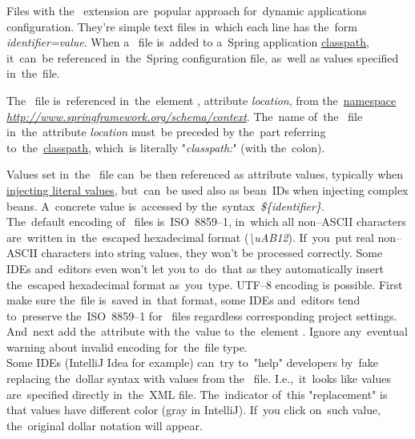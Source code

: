Files with the~ extension are~popular approach for~dynamic applications configuration. They're simple text files in~which each line has the~form \textit{identifier=value}. When a~ file is~added to a~Spring application \hyperref[classpath]{classpath}, it~can~be referenced in~the~Spring configuration file, as~well as values specified in~the~file.

The~ file is~referenced in~the~element , attribute \textit{location}, from the~\hyperref[namespaces]{namespace} \textit{\href{http://www.springframework.org/schema/context}{http://www.springframework.org/schema/context}}. The~name of~the~ file in~the~attribute \textit{location} must~be preceded by the~part referring to~the~\hyperref[classpath]{classpath}, which~is literally "\textit{classpath:}" (with the~colon).

Values set in~the~ file can~be then referenced as attribute values, typically when \hyperref[injectingliteralvalues]{injecting literal values}, but~can~be used also as bean~IDs when injecting complex beans. A~concrete value is~accessed by the~syntax~\textit{\$\{identifier\}}.\\

\warning The~default encoding of~ files is~\mbox{ISO~8859--1}, in~which all non--ASCII characters are~written in~the~escaped hexadecimal format (\textit{\textbackslash uAB12}). If~you~put real non--ASCII characters into string values, they won't be processed correctly. Some IDEs and~editors even won't let you to~do~that as they automatically insert the~escaped hexadecimal format as~you~type. UTF--8 encoding is possible. First make sure the~file is~saved in~that format, some IDEs and~editors tend to~preserve the~\mbox{ISO~8859--1} for~ files regardless corresponding project settings. And~next add the~attribute  with the~value  to~the~element . Ignore any~eventual warning about invalid encoding for~the~file type.\\

\warning Some IDEs (IntelliJ Idea for example) can~try to~"help" developers by~fake replacing the~dollar syntax with values from the~ file. I.e.,~it~looks like values are~specified directly in~the~XML file. The~indicator of~this "replacement" is that values have different color (gray in IntelliJ). If~you click on~such value, the~original dollar notation will appear.

